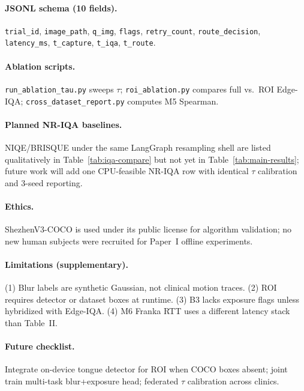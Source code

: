 \paragraph{JSONL schema (10 fields).}
\texttt{trial\_id}, \texttt{image\_path}, \texttt{q\_img}, \texttt{flags}, \texttt{retry\_count}, \texttt{route\_decision}, \texttt{latency\_ms}, \texttt{t\_capture}, \texttt{t\_iqa}, \texttt{t\_route}.

\paragraph{Ablation scripts.}
\texttt{run\_ablation\_tau.py} sweeps $\tau$; \texttt{roi\_ablation.py} compares full vs.\ ROI Edge-IQA; \texttt{cross\_dataset\_report.py} computes M5 Spearman.

\paragraph{Planned NR-IQA baselines.}
NIQE/BRISQUE under the same LangGraph resampling shell are listed qualitatively in Table~\ref{tab:iqa-compare} but not yet in Table~\ref{tab:main-results}; future work will add one CPU-feasible NR-IQA row with identical $\tau$ calibration and 3-seed reporting.

\paragraph{Ethics.}
ShezhenV3-COCO is used under its public license for algorithm validation; no new human subjects were recruited for Paper~I offline experiments.

\paragraph{Limitations (supplementary).}
(1) Blur labels are synthetic Gaussian, not clinical motion traces.
(2) ROI requires detector or dataset boxes at runtime.
(3) B3 lacks exposure flags unless hybridized with Edge-IQA.
(4) M6 Franka RTT uses a different latency stack than Table~II.

\paragraph{Future checklist.}
Integrate on-device tongue detector for ROI when COCO boxes absent; joint train multi-task blur+exposure head; federated $\tau$ calibration across clinics.
